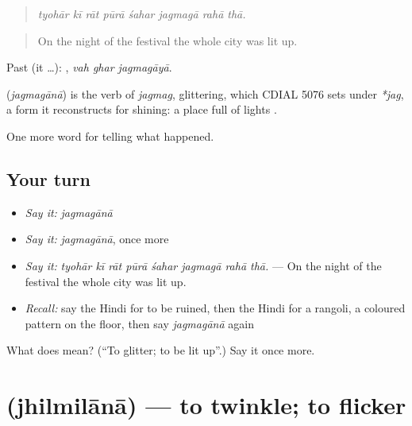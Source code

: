 \begin{quote}
       
\end{quote}

\begin{quote}
\emph{tyohār kī rāt pūrā śahar jagmagā rahā thā.}
\end{quote}

\begin{quote}
On the night of the festival the whole city was lit up.
\end{quote}

Past (it …):   , \emph{vah ghar jagmagāyā}.

\begin{cousinweb}
\textbf{} (\emph{jagmagānā}) is the verb of \emph{jagmag}, glittering, which CDIAL 5076 sets under \emph{*jag}, a form it reconstructs for shining: a place full of lights \textbf{ }.
\end{cousinweb}

\begin{grammarlens}[title={What you've built}]
One more word for telling what happened.
\end{grammarlens}

\subsection*{Your turn}
\begin{itemize}
\raggedright
  \item \emph{Say it:} \emph{jagmagānā}
  \item \emph{Say it:} \emph{jagmagānā}, once more
  \item \emph{Say it:} \emph{tyohār kī rāt pūrā śahar jagmagā rahā thā.} — On the night of the festival the whole city was lit up.
  \item \emph{Recall:} say the Hindi for to be ruined, then the Hindi for a rangoli, a coloured pattern on the floor, then say \emph{jagmagānā} again
\end{itemize}

\begin{tcolorbox}[breakable,colback=teal!4,colframe=teal!35!black,title={Before you move on}]
What does  mean? (\textquotedblleft{}To glitter; to be lit up\textquotedblright{}.) Say it once more.
\end{tcolorbox}
\section[\texorpdfstring{\hi{झिलमिलाना} (jhilmilānā)}{झिलमिलाना (jhilmilānā)}]{ (jhilmilānā) — to twinkle; to flicker}

